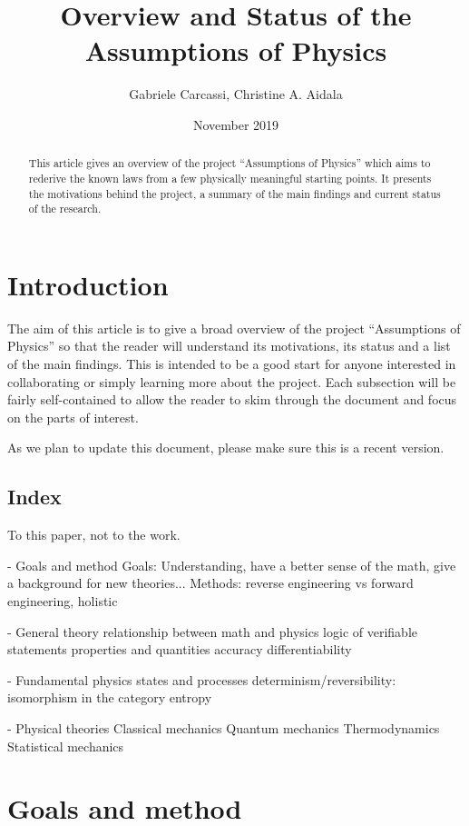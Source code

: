 \documentclass[twocolumn]{article}
\title{Overview and Status of the Assumptions of Physics}
\author{Gabriele Carcassi, Christine A. Aidala}
\date{November 2019}
\begin{document}
\maketitle

\begin{abstract}
	This article gives an overview of the project ``Assumptions of Physics'' which aims to rederive the known laws from a few physically meaningful starting points. It presents the motivations behind the project, a summary of the main findings and current status of the research.	
\end{abstract}

\section{Introduction}

The aim of this article is to give a broad overview of the project ``Assumptions of Physics'' so that the reader will understand its motivations, its status and a list of the main findings. This is intended to be a good start for anyone interested in collaborating or simply learning more about the project. Each subsection will be fairly self-contained to allow the reader to skim through the document and focus on the parts of interest.

As we plan to update this document, please make sure this is a recent version.

\subsection{Index}
To this paper, not to the work.

- Goals and method
Goals: Understanding, have a better sense of the math, give a background for new theories...
Methods: reverse engineering vs forward engineering, holistic

- General theory
relationship between math and physics
logic of verifiable statements
properties and quantities
accuracy
differentiability

- Fundamental physics
states and processes
determinism/reversibility: isomorphism in the category
entropy

- Physical theories
Classical mechanics
Quantum mechanics
Thermodynamics
Statistical mechanics

\section{Goals and method}
\end{document}

